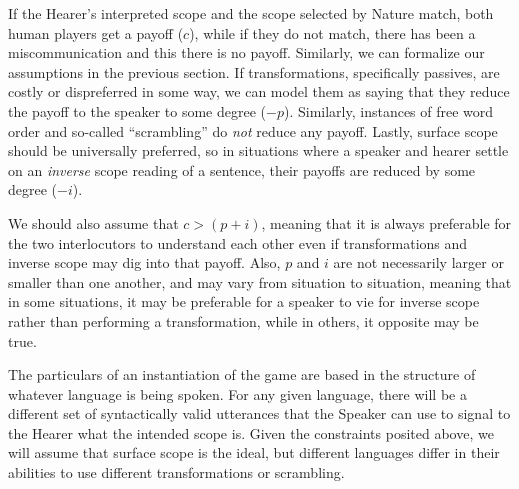 \documentclass{article}
\begin{document}
If the Hearer's interpreted scope and the scope selected by Nature match, both human players get a payoff ($c$), while if they do not match, there has been a miscommunication and this there is no payoff.
Similarly, we can formalize our assumptions in the previous section.
If transformations, specifically passives, are costly or dispreferred in some way, we can model them as saying that they reduce the payoff to the speaker to some degree ($-p$).
Similarly, instances of free word order and so-called ``scrambling'' do \emph{not} reduce any payoff.
Lastly, surface scope should be universally preferred, so in situations where a speaker and hearer settle on an \emph{inverse} scope reading of a sentence, their payoffs are reduced by some degree ($-i$).

We should also assume that $c > (p + i)$, meaning that it is always preferable for the two interlocutors to understand each other even if transformations and inverse scope may dig into that payoff.
Also, $p$ and $i$ are not necessarily larger or smaller than one another, and may vary from situation to situation, meaning that in some situations, it may be preferable for a speaker to vie for inverse scope rather than performing a transformation, while in others, it opposite may be true.

The particulars of an instantiation of the game are based in the structure of whatever language is being spoken.
For any given language, there will be a different set of syntactically valid utterances that the Speaker can use to signal to the Hearer what the intended scope is.
Given the constraints posited above, we will assume that surface scope is the ideal, but different languages differ in their abilities to use different transformations or scrambling.


\begin{figure}
\begin{center}
\end{center}
\end{figure}
\end{document}
